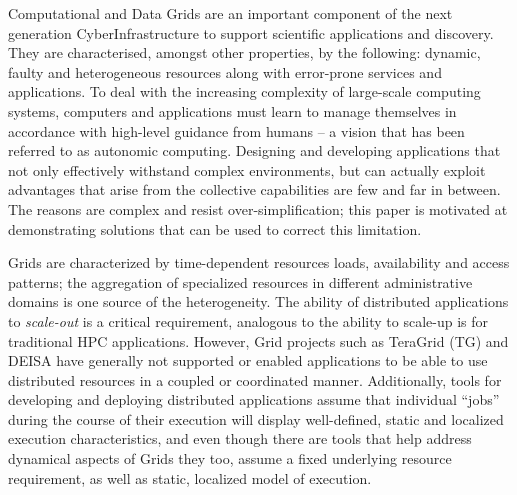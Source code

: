 \documentclass{sig-alternate}
\begin{document}
Computational and Data Grids are an important component of the next generation CyberInfrastructure to support scientific applications and discovery.  They are characterised, amongst other properties, by the following: dynamic, faulty and heterogeneous resources along with error-prone services and applications.  To deal with the increasing complexity of large-scale computing systems, computers and applications must learn to manage themselves in accordance with high-level guidance from humans -- a vision that has been referred to as autonomic computing.  Designing and developing applications that not only effectively withstand complex environments, but can actually exploit advantages that arise from the collective capabilities are few and far in between. The reasons are complex and resist over-simplification; this paper is motivated at demonstrating solutions that can be used to correct this limitation.





Grids are characterized by time-dependent resources loads, availability and access patterns; the aggregation of specialized resources in different administrative domains is one source of the heterogeneity.  The ability of distributed applications to {\it scale-out} is a critical requirement, analogous to the ability to scale-up is for traditional HPC applications. However, Grid projects such as TeraGrid (TG) and DEISA have generally not supported or enabled applications to be able to use distributed resources in a coupled or coordinated manner.  Additionally, tools for developing and deploying distributed applications assume that individual ``jobs'' during the course of their execution will display well-defined, static and localized execution characteristics, and even though there are tools that help address dynamical aspects of Grids they too, assume a fixed underlying resource requirement, as well as static, localized model of execution.
\end{document}
